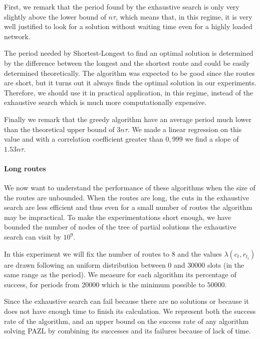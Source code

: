 \documentclass[a4paper,10pt]{article}
\begin{document}
      First, we remark that the period found by the exhaustive search is only very slightly above the lower bound of 
      $n\tau$, which means that, in this regime, it is very well justified to look for a solution without waiting time even for a highly loaded network. 
      
      The period needed by Shortest-Longest to find an optimal solution is determined by the difference between the longest and the shortest route and could be easily determined theoretically. The algorithm was expected to be good since the routes are short, but it turns out it always finds the optimal solution in our experiments. Therefore, we should use it in practical application, in this regime, instead of the exhaustive search which is much more computationally expensive. 
      
      Finally we remark that the greedy algorithm have an average period much lower than the theoretical upper bound of $3n\tau$. We made a linear regression on this value and with a correlation coefficient greater than $0,999$ we find a slope of $1.53n\tau$.
      
      

      \paragraph{Long routes}
      
      We now want to understand the performance of these algorithms when the size of the routes are unbounded. When the routes are long, the cuts in the exhaustive search are less efficient and thus even for a small number of routes the algorithm may be impractical. To make the experimentations short enough, we have bounded the number of nodes of the tree of partial solutions the exhaustive search can visit by $10^9$.
      
      In this experiment we will fix the number of routes to $8$ and the values $\lambda(c_t,r_{t_i})$ are drawn following an uniform distribution between $0$ and $30000$ slots (in the same range as the period).
      We measure for each algorithm its percentage of success, for periods from $20000$ which is the minimum possible to $50000$.
      
      Since the exhaustive search can fail because there are no solutions or because it does not have enough time to finish its calculation. We represent both the success rate of the algorithm, and an upper bound on the success rate of any algorithm solving PAZL by combining its successes and its failures because of lack of time. 
      
\end{document}

